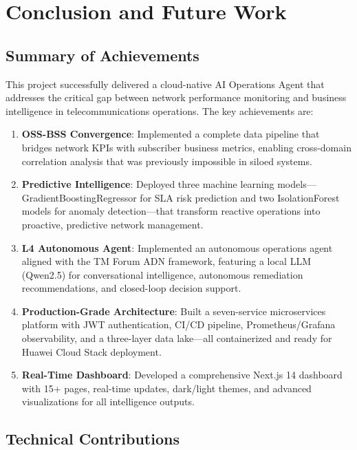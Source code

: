 \chapter{Conclusion and Future Work}
\label{ch:conclusion}

\section{Summary of Achievements}

This project successfully delivered a cloud-native AI Operations Agent that addresses the critical gap between network performance monitoring and business intelligence in telecommunications operations. The key achievements are:

\begin{enumerate}
    \item \textbf{OSS-BSS Convergence}: Implemented a complete data pipeline that bridges network KPIs with subscriber business metrics, enabling cross-domain correlation analysis that was previously impossible in siloed systems.

    \item \textbf{Predictive Intelligence}: Deployed three machine learning models---GradientBoostingRegressor for SLA risk prediction and two IsolationForest models for anomaly detection---that transform reactive operations into proactive, predictive network management.

    \item \textbf{L4 Autonomous Agent}: Implemented an autonomous operations agent aligned with the TM Forum ADN framework, featuring a local LLM (Qwen2.5) for conversational intelligence, autonomous remediation recommendations, and closed-loop decision support.

    \item \textbf{Production-Grade Architecture}: Built a seven-service microservices platform with JWT authentication, CI/CD pipeline, Prometheus/Grafana observability, and a three-layer data lake---all containerized and ready for Huawei Cloud Stack deployment.

    \item \textbf{Real-Time Dashboard}: Developed a comprehensive Next.js 14 dashboard with 15+ pages, real-time updates, dark/light themes, and advanced visualizations for all intelligence outputs.
\end{enumerate}

\section{Technical Contributions}

